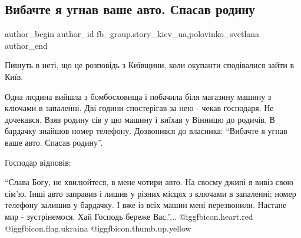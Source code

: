 
 
 
 
 
 
\subsection{Вибачте я угнав ваше авто. Спасав родину}
\label{sec:01_05_2022.fb.fb_group.story_kiev_ua.1.ugon_avto}
 
\ifcmt
 author_begin
   author_id fb_group.story_kiev_ua,polovinko_svetlana
 author_end
\fi


\raggedcolumns
\begin{multicols}{2} %
\setlength{\parindent}{0pt}


Пишуть в неті, що це розповідь з Київщини, коли окупанти сподівалися зайти в
Київ.

Одна людина вийшла з бомбосховища і побачила біля магазину машину з ключами в
запаленні. Дві години спостерігав за нею - чекав господаря. Не дочекався. Взяв
родину сів у цю машину і виїхав у Вінницю до родичів. В бардачку знайшов номер
телефону. Дозвонився до власника: \enquote{Вибачте я угнав ваше авто. Спасав
родину}.

Господар відповів:

\enquote{Слава Богу, не хвилюйтеся, в мене чотири авто. На своєму джипі я вивіз
свою сім'ю. Інші авто заправив і лишив у різних місцях з ключами в запаленні;
номер телефону залишив у бардачку. І вже із всіх машин мені перезвонили.
Настане мир - зустрінемося. Хай Господь береже Вас.}... @igg{fbicon.heart.red}
@igg{fbicon.flag.ukraina} @igg{fbicon.thumb.up.yellow}

\end{multicols} %

